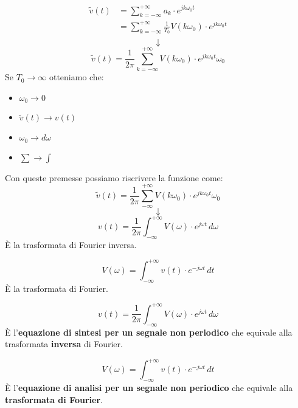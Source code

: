 \documentclass[a4paper]{article}
\begin{document}
\begin{example}
  \vspace{1em}
  \noindent
  \[
    \begin{aligned}
      \tilde{v}(t) &= \sum_{k=-\infty}^{+\infty} a_k \cdot e^{j k \omega_0 t}\\
                   &= \sum_{k=-\infty}^{+\infty} \frac{1}{T_0} V(k \omega_0) \cdot e^{j k \omega_0 t}\\
    \end{aligned}
  \] 
  \[
  \downarrow
  \] 
  \[
    \tilde{v}(t) = \frac{1}{2 \pi } \sum_{k=-\infty}^{+\infty} V(k \omega_0) \cdot e^{j k \omega_0 t} \omega_0
  \] 
  Se \( T_0 \to \infty \) otteniamo che:
  \begin{itemize}
    \item \( \omega_0 \to 0 \) 
    \item \( \tilde{v}(t) \to v(t) \) 
    \item \( \omega_0 \to d \omega \) 
    \item \( \sum \to \int \) 
  \end{itemize}
  Con queste premesse possiamo riscrivere la funzione come:
  \[
    \tilde{v}(t) = \frac{1}{2 \pi } \sum_{-\infty}^{+\infty} V(k \omega_0) \cdot e^{j k \omega_0 t} \omega_0
  \] 
  \[
  \downarrow
  \] 
  \[
    v(t) = \frac{1}{2 \pi } \int_{-\infty}^{+\infty} V(\omega) \cdot e^{j \omega t} \, d\omega
  \] 
  È la trasformata di Fourier inversa.

  \vspace{1em}
  \noindent
  \[
    V(\omega) = \int_{-\infty}^{+\infty} v(t) \cdot e^{-j \omega t} \, dt
  \] 
  È la trasformata di Fourier.
\end{example}

\begin{definition}
  \[
    v(t) = \frac{1}{2 \pi } \int_{-\infty}^{+\infty} V(\omega) \cdot e^{j \omega t} \, d\omega
  \] 
  È l'\textbf{equazione di sintesi per un segnale non periodico} che equivale alla
  trasformata \textbf{inversa} di Fourier.

  \vspace{1em}
  \noindent
  \[
    V(\omega) = \int_{-\infty}^{+\infty} v(t) \cdot e^{-j \omega t} \, dt
  \] 
  È l'\textbf{equazione di analisi per un segnale non periodico} che equivale alla
  \textbf{trasformata di Fourier}.
\end{definition}
\end{document}
